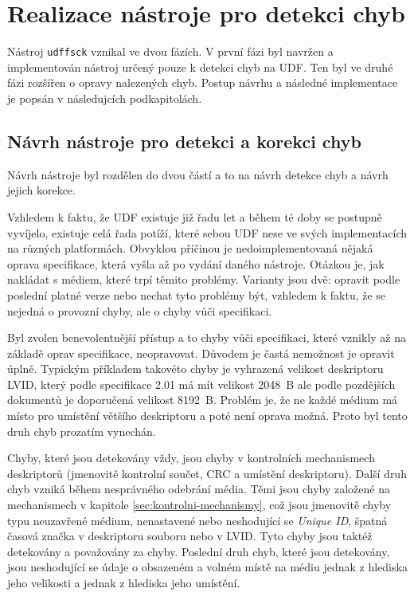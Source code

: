 \chapter{Realizace nástroje pro detekci chyb}
\label{ch:realizace}
Nástroj \texttt{udffsck} vznikal ve dvou fázích. V první fázi byl navržen a implementován nástroj určený pouze k detekci chyb na UDF. Ten byl ve druhé fázi rozšířen o opravy nalezených chyb. Postup návrhu a následné implementace je popsán v následujcích podkapitolách.

\section{Návrh nástroje pro detekci a korekci chyb}
\label{sec:navrh}
Návrh nástroje byl rozdělen do dvou částí a to na návrh detekce chyb a návrh jejich korekce.

Vzhledem k faktu, že UDF existuje již řadu let a během té doby se postupně vyvíjelo, existuje celá řada potíží, které sebou UDF nese ve svých implementacích na různých platformách. Obvyklou příčinou je nedoimplementovaná nějaká oprava specifikace, která vyšla až po vydání daného nástroje. Otázkou je, jak nakládat s médiem, které trpí těmito problémy. Varianty jsou dvě: opravit podle poslední platné verze nebo nechat tyto problémy být, vzhledem k faktu, že se nejedná o provozní chyby, ale o chyby vůči specifikaci.

Byl zvolen benevolentnější přístup a to chyby vůči specifikaci, které vznikly až na základě oprav specifikace, neopravovat. Důvodem je častá nemožnost je opravit úplně. Typickým příkladem takovéto chyby je vyhrazená velikost deskriptoru LVID, který podle specifikace 2.01 má mít velikost 2048~B ale podle pozdějších dokumentů je doporučená velikost 8192~B. Problém je, že ne každé médium má místo pro umístění většího deskriptoru a poté není oprava možná. Proto byl tento druh chyb prozatím vynechán.

Chyby, které jsou detekovány vždy, jsou chyby v kontrolních mechanismech deskriptorů (jmenovitě kontrolní součet, CRC a umístění deskriptoru). Další druh chyb vzniká během nesprávného odebrání média. Těmi jsou chyby založené na mechanismech v kapitole \ref{sec:kontrolni-mechanismy}, což jsou jmenovitě chyby typu neuzavřené médium, nenastavené nebo neshodující se \textit{Unique ID}, špatná časová značka v deskriptoru souboru nebo v LVID. Tyto chyby jsou taktéž detekovány a považovány za chyby. Poslední druh chyb, které jsou detekovány, jsou neshodující se údaje o obsazeném a volném místě na médiu jednak z hlediska jeho velikosti a jednak z hlediska jeho umístění.

